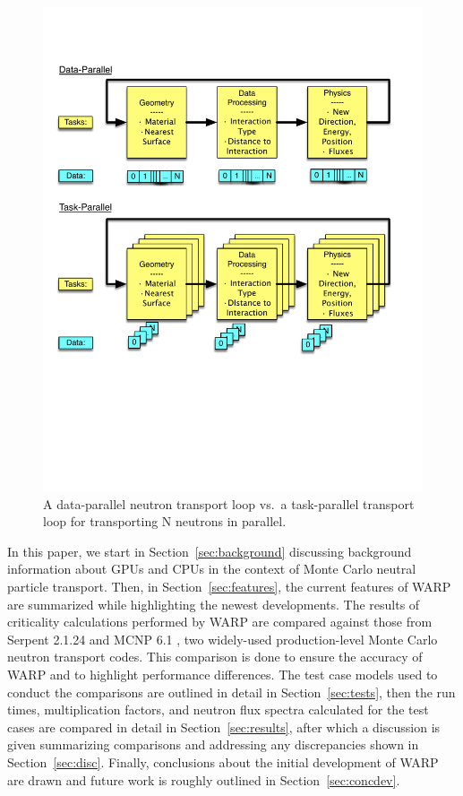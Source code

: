 \documentclass[preprint,12pt]{elsarticle}
\begin{document}
\begin{figure}[h!] 
  \centering
    \includegraphics[width=\textwidth]{graphics/datavtask.pdf}
     \caption{A data-parallel neutron transport loop vs.\ a task-parallel transport loop for transporting N neutrons in parallel.  \label{datavtask} }
\end{figure}

In this paper, we start in Section~\ref{sec:background} discussing background information about GPUs and CPUs in the context of Monte Carlo neutral particle transport. Then, in Section~\ref{sec:features}, the current features of WARP are summarized while highlighting the newest developments.  The results of criticality calculations performed by WARP are compared against those from Serpent 2.1.24 \cite{jaakko,serpent} and MCNP 6.1 \cite{mcnp6}, two widely-used production-level Monte Carlo neutron transport codes.  This comparison is done to ensure the accuracy of WARP and to highlight performance differences.  The test case models used to conduct the comparisons are outlined in detail in Section~\ref{sec:tests}, then the run times, multiplication factors, and neutron flux spectra calculated for the test cases are compared in detail in Section~\ref{sec:results}, after which a discussion is given summarizing comparisons and addressing any discrepancies shown in Section~\ref{sec:disc}.  Finally, conclusions about the initial development of WARP are drawn and future work is roughly outlined in Section~\ref{sec:concdev}. 
\end{document}

